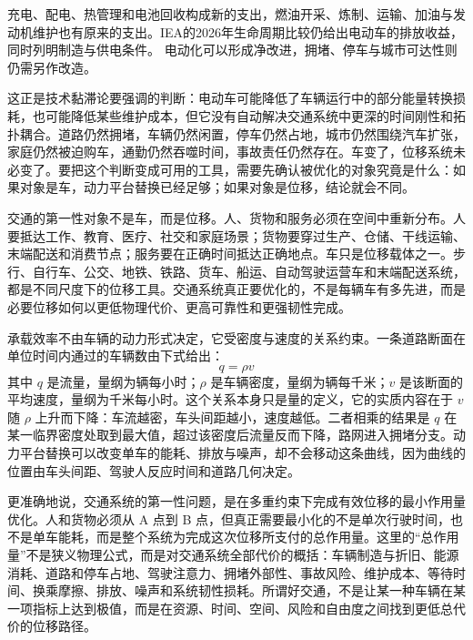 充电、配电、热管理和电池回收构成新的支出，燃油开采、炼制、运输、加油与发动机维护也有原来的支出。IEA的2026年生命周期比较仍给出电动车的排放收益，同时列明制造与供电条件。\cite{iea2026evlifecycle} 电动化可以形成净改进，拥堵、停车与城市可达性则仍需另作改造。

这正是技术黏滞论要强调的判断：电动车可能降低了车辆运行中的部分能量转换损耗，也可能降低某些维护成本，但它没有自动解决交通系统中更深的时间刚性和拓扑耦合。道路仍然拥堵，车辆仍然闲置，停车仍然占地，城市仍然围绕汽车扩张，家庭仍然被迫购车，通勤仍然吞噬时间，事故责任仍然存在。车变了，位移系统未必变了。要把这个判断变成可用的工具，需要先确认被优化的对象究竟是什么：如果对象是车，动力平台替换已经足够；如果对象是位移，结论就会不同。


交通的第一性对象不是车，而是位移。人、货物和服务必须在空间中重新分布。人要抵达工作、教育、医疗、社交和家庭场景；货物要穿过生产、仓储、干线运输、末端配送和消费节点；服务要在正确时间抵达正确地点。车只是位移载体之一。步行、自行车、公交、地铁、铁路、货车、船运、自动驾驶运营车和末端配送系统，都是不同尺度下的位移工具。交通系统真正要优化的，不是每辆车有多先进，而是必要位移如何以更低物理代价、更高可靠性和更强韧性完成。

承载效率不由车辆的动力形式决定，它受密度与速度的关系约束。一条道路断面在单位时间内通过的车辆数由下式给出：
\begin{equation}
q=\rho v
\label{eq:ch25-flow}
\end{equation}
其中 $q$ 是流量，量纲为辆每小时；$\rho$ 是车辆密度，量纲为辆每千米；$v$ 是该断面的平均速度，量纲为千米每小时。这个关系本身只是量的定义，它的实质内容在于 $v$ 随 $\rho$ 上升而下降：车流越密，车头间距越小，速度越低。二者相乘的结果是 $q$ 在某一临界密度处取到最大值，超过该密度后流量反而下降，路网进入拥堵分支\cite{helbing2001traffic}。动力平台替换可以改变单车的能耗、排放与噪声，却不会移动这条曲线，因为曲线的位置由车头间距、驾驶人反应时间和道路几何决定。

更准确地说，交通系统的第一性问题，是在多重约束下完成有效位移的最小作用量优化。人和货物必须从 A 点到 B 点，但真正需要最小化的不是单次行驶时间，也不是单车能耗，而是整个系统为完成这次位移所支付的总作用量。这里的“总作用量”不是狭义物理公式，而是对交通系统全部代价的概括：车辆制造与折旧、能源消耗、道路和停车占地、驾驶注意力、拥堵外部性、事故风险、维护成本、等待时间、换乘摩擦、排放、噪声和系统韧性损耗。所谓好交通，不是让某一种车辆在某一项指标上达到极值，而是在资源、时间、空间、风险和自由度之间找到更低总代价的位移路径。

